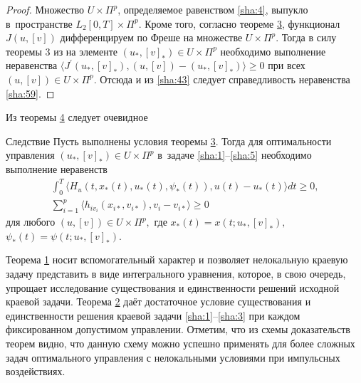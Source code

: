 \smallskip

\begin{proof} Множество $U\times \Pi ^{p} $, определяемое равенством \eqref{sha:4}, выпукло в~пространстве $L_{2}[0,T]\times \Pi ^{p}$. 
Кроме того, согласно теореме \hyperlink{sha:th:3)}{3}, функционал $J(u,[v])$ дифференцируем по Фреше на множестве $U\times \Pi ^{p} $. 
Тогда в силу теоремы 3 из \cite[с.~524]{sha:bib:10} на элементе $(u_{*},[v]_{*})\in U\times \Pi ^{p} $ необходимо выполнение неравенства $\langle J^{\prime}(u_{*},[v]_{*}),(u,[v])-(u_{*},[v]_{*})\rangle \ge 0$ при всех $(u,[v])\in U\times \Pi ^{p} $. 
Отсюда и из \eqref{sha:43} следует справедливость неравенства \eqref{sha:59}. \end{proof}

\smallskip

Из теоремы \hyperlink{sha:th:4)}{4} следует  очевидное

\begin{newthm}{Следствие} Пусть выполнены условия теоремы {\rm \hyperlink{sha:th:3)}{3}.} 
Тогда для оптимальности управления $\left(u_{*} ,\left[v\right]_{*} \right)\in U\times \Pi ^{p}$ в~задаче \eqref{sha:1}--\eqref{sha:5} необходимо выполнение неравенств
\begin{gather} \label{sha:60} 
\int_{0}^{T}\langle H_{u}(t,x_{*}(t),u_{*}(t),\psi_{*}(t)),u(t)-u_{*}(t)\rangle  dt\ge 0, 
\\
 \label{sha:61} 
\sum _{i=1}^{p}\langle h_{iv_{i}}(x_{i*},v_{i*}),v_{i} -v_{i*}\rangle \ge 0  
\end{gather} 
для любого $(u, [v])\in U\times \Pi ^{p},$ где $x_{*}(t)=x(t;u_{*},[v]_{*}),$ $\psi_{*}(t)=\psi(t;u_{*},[v]_{*}).$
\end{newthm}

\pagebreak

 Теорема  \hyperlink{sha:th:1)}{1} носит вспомогательный характер и позволяет нелокальную краевую задачу представить в виде интегрального уравнения, которое, в свою очередь, упрощает  исследование существования и единственности решений исходной краевой задачи. 
Теорема \hyperlink{sha:th2}{2} даёт достаточное условие существования и единственности решения краевой задачи \eqref{sha:1}--\eqref{sha:3} при каждом фиксированном допустимом управлении. 
Отметим, что из  схемы доказательств теорем видно, что данную схему можно успешно применять для более сложных задач оптимального управления с нелокальными условиями при импульсных воздействиях.



